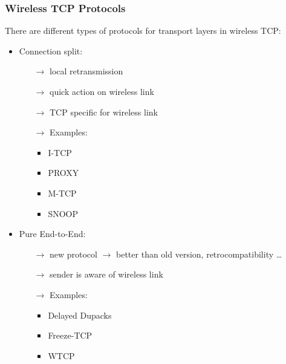 \subsubsection{Wireless TCP Protocols}
There are different types of protocols for transport layers in wireless TCP:
\begin{itemize}
    \item Connection split:
    \begin{itemize}
        \item[$\rightarrow$] local retransmission
        \item[$\rightarrow$] quick action on wireless link
        \item[$\rightarrow$] TCP specific for wireless link
        \item[$\rightarrow$] Examples:\\[0.15cm]
        \begin{minipage}{0.3 \textwidth}
            \begin{itemize}
                \item I-TCP
                \item PROXY
            \end{itemize}
        \end{minipage}
        \begin{minipage}{0.3 \textwidth}
            \begin{itemize}
                \item M-TCP
                \item SNOOP
            \end{itemize}
        \end{minipage}
    \end{itemize}
    \item Pure End-to-End:
    \begin{itemize}
        \item[$\rightarrow$] new protocol $\rightarrow$ better than old version, retrocompatibility \dots
        \item[$\rightarrow$] sender is aware of wireless link
        \item[$\rightarrow$] Examples:\\[0.15cm]
        \begin{minipage}{0.3 \textwidth}
            \begin{itemize}
                \item Delayed Dupacks
                \item Freeze-TCP
                \item WTCP

\end{itemize}
\end{minipage}
\end{itemize}
\end{itemize}
